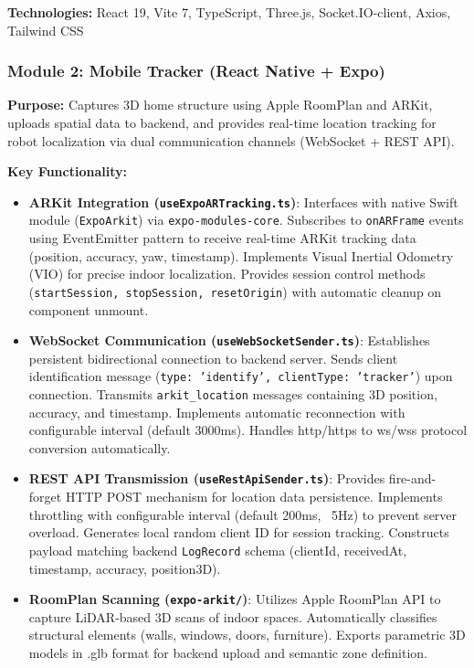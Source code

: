 \documentclass[conference]{IEEEtran}
\begin{document}
\textbf{Technologies:} React 19, Vite 7, TypeScript, Three.js, Socket.IO-client, Axios, Tailwind CSS

\subsubsection{Module 2: Mobile Tracker (React Native + Expo)}

\textbf{Purpose:} Captures 3D home structure using Apple RoomPlan and ARKit, uploads spatial data to backend, and provides real-time location tracking for robot localization via dual communication channels (WebSocket + REST API).

\textbf{Key Functionality:}
\begin{itemize}
    \item \textbf{ARKit Integration (\texttt{useExpoARTracking.ts})}: Interfaces with native Swift module (\texttt{ExpoArkit}) via \texttt{expo-modules-core}. Subscribes to \texttt{onARFrame} events using EventEmitter pattern to receive real-time ARKit tracking data (position, accuracy, yaw, timestamp). Implements Visual Inertial Odometry (VIO) for precise indoor localization. Provides session control methods (\texttt{startSession, stopSession, resetOrigin}) with automatic cleanup on component unmount.
    \item \textbf{WebSocket Communication (\texttt{useWebSocketSender.ts})}: Establishes persistent bidirectional connection to backend server. Sends client identification message (\texttt{type: 'identify', clientType: 'tracker'}) upon connection. Transmits \texttt{arkit\_location} messages containing 3D position, accuracy, and timestamp. Implements automatic reconnection with configurable interval (default 3000ms). Handles http/https to ws/wss protocol conversion automatically.
    \item \textbf{REST API Transmission (\texttt{useRestApiSender.ts})}: Provides fire-and-forget HTTP POST mechanism for location data persistence. Implements throttling with configurable interval (default 200ms, ~5Hz) to prevent server overload. Generates local random client ID for session tracking. Constructs payload matching backend \texttt{LogRecord} schema (clientId, receivedAt, timestamp, accuracy, position3D).
    \item \textbf{RoomPlan Scanning (\texttt{expo-arkit/})}: Utilizes Apple RoomPlan API to capture LiDAR-based 3D scans of indoor spaces. Automatically classifies structural elements (walls, windows, doors, furniture). Exports parametric 3D models in .glb format for backend upload and semantic zone definition.
\end{itemize}
\end{document}
